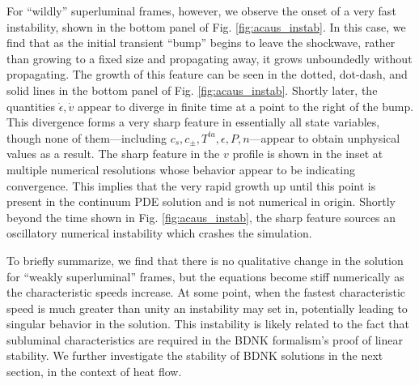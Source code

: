 \documentclass[%
notitlepage,
superscriptaddress,
nofootinbib,
amsmath,
amssymb,
aps,
twocolumn
]{revtex4-1}
\begin{document}
For ``wildly'' superluminal frames, however, we observe the onset of a very fast instability, shown in the bottom panel of Fig. \ref{fig:acaus_instab}.
In this case, we find that as the initial transient ``bump'' begins to leave the shockwave, rather than growing to a fixed size and propagating away, it grows unboundedly without propagating.  The growth of this feature can be seen in the dotted, dot-dash, and solid lines in the bottom panel of Fig. \ref{fig:acaus_instab}.  Shortly later, the quantities $\dot{\epsilon}, \dot{v}$ appear to diverge in finite time at a point to the right of the bump.  This divergence forms a very sharp feature in essentially all state variables, though none of them---including $c_s, c_\pm, T^{ta}, \epsilon, P, n$---appear to obtain unphysical values as a result.  The sharp feature in the $v$ profile is shown in the inset at multiple numerical resolutions whose behavior appear to be indicating convergence.  This implies that the very rapid growth up until this point is present in the continuum PDE solution and is not numerical in origin.  Shortly beyond the time shown in Fig. \ref{fig:acaus_instab}, the sharp feature sources an oscillatory numerical instability which crashes the simulation.

To briefly summarize, we find that there is no qualitative change in the solution for ``weakly superluminal'' frames, but the equations become stiff numerically as the characteristic speeds increase.  At some point, when the fastest characteristic speed is much greater than unity an instability may set in, potentially leading to singular behavior in the solution. 
This instability is likely related to the fact that subluminal characteristics are required in the BDNK formalism's proof of linear stability.
We further investigate the stability of BDNK solutions in the next section, in the context of heat flow.
\end{document}
